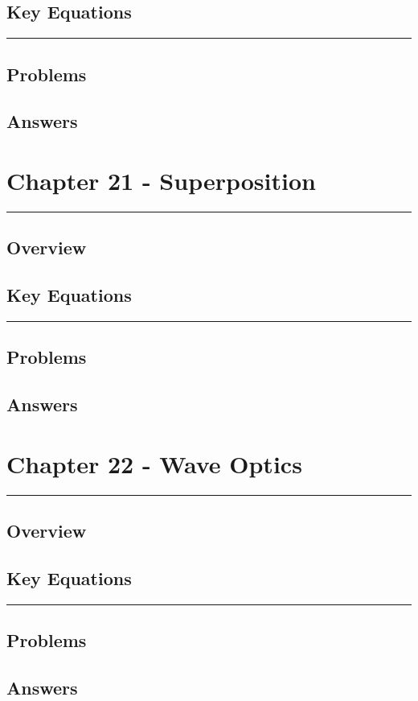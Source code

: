 \documentclass[a4paper,12pt]{article}
\begin{document}
\subsection*{Key Equations}

\begin{center}
  \rule{6cm}{0.5pt}
\end{center}
\subsection*{Problems}
\subsection*{Answers}

\pagebreak
\section*{Chapter 21 - Superposition}
\rule{\linewidth}{1pt}
\subsection*{Overview}
\subsection*{Key Equations}

\begin{center}
  \rule{6cm}{0.5pt}
\end{center}
\subsection*{Problems}
\subsection*{Answers}

\pagebreak
\section*{Chapter 22 - Wave Optics}
\rule{\linewidth}{1pt}
\subsection*{Overview}
\subsection*{Key Equations}

\begin{center}
  \rule{6cm}{0.5pt}
\end{center}
\subsection*{Problems}
\subsection*{Answers}
\end{document}
